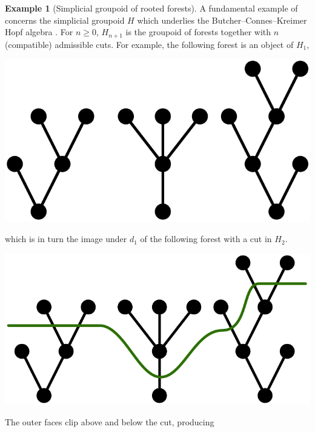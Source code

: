 \documentclass{conm-p-l}
\theoremstyle{definition}
\newtheorem{example}[theorem]{Example}
\theoremstyle{remark}
\begin{document}
\begin{example}[Simplicial groupoid of rooted forests]\label{ex forests}
A fundamental example of \cite{GKT1} concerns the simplicial groupoid $H$ which underlies the Butcher--Connes--Kreimer Hopf algebra \cite{ConnesKreimer:HARNG}.
For $n \geq 0$, $H_{n+1}$ is the groupoid of forests together with $n$ (compatible) admissible cuts.
For example, the following forest is an object of $H_1$,
\begin{center}
\includegraphics[scale=0.2]{forest_no_cut.pdf}
\end{center}
which is in turn the image under $d_1$ of the following forest with a cut in $H_2$.
\begin{center}
\includegraphics[scale=0.2]{forest_with_cut.pdf}
\end{center}
The outer faces clip above and below the cut, producing 
\begin{center}

\end{center}
\end{example}
\end{document}

